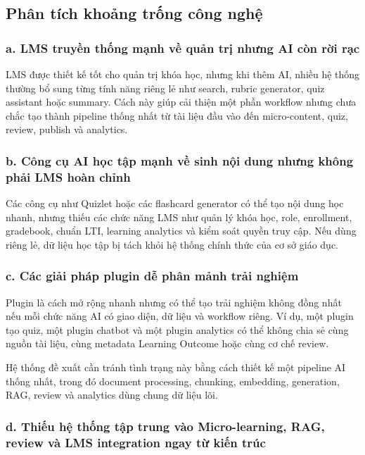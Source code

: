\subsection{Phân tích khoảng trống công nghệ}

\subsubsection*{a. LMS truyền thống mạnh về quản trị nhưng AI còn rời rạc}

LMS được thiết kế tốt cho quản trị khóa học, nhưng khi thêm AI, nhiều hệ thống
thường bổ sung từng tính năng riêng lẻ như search, rubric generator, quiz
assistant hoặc summary. Cách này giúp cải thiện một phần workflow nhưng chưa
chắc tạo thành pipeline thống nhất từ tài liệu đầu vào đến micro-content, quiz,
review, publish và analytics.

\subsubsection*{b. Công cụ AI học tập mạnh về sinh nội dung nhưng không phải LMS hoàn chỉnh}

Các công cụ như Quizlet hoặc các flashcard generator có thể tạo nội dung học
nhanh, nhưng thiếu các chức năng LMS như quản lý khóa học, role, enrollment,
gradebook, chuẩn LTI, learning analytics và kiểm soát quyền truy cập. Nếu dùng
riêng lẻ, dữ liệu học tập bị tách khỏi hệ thống chính thức của cơ sở giáo dục.

\subsubsection*{c. Các giải pháp plugin dễ phân mảnh trải nghiệm}

Plugin là cách mở rộng nhanh nhưng có thể tạo trải nghiệm không đồng nhất nếu
mỗi chức năng AI có giao diện, dữ liệu và workflow riêng. Ví dụ, một plugin tạo
quiz, một plugin chatbot và một plugin analytics có thể không chia sẻ cùng
nguồn tài liệu, cùng metadata Learning Outcome hoặc cùng cơ chế review.

Hệ thống đề xuất cần tránh tình trạng này bằng cách thiết kế một pipeline AI
thống nhất, trong đó document processing, chunking, embedding, generation, RAG,
review và analytics dùng chung dữ liệu lõi.

\subsubsection*{d. Thiếu hệ thống tập trung vào Micro-learning, RAG, review và LMS integration ngay từ kiến trúc}

